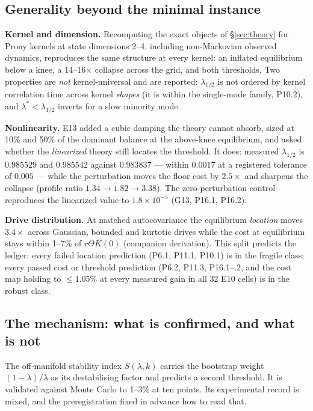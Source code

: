 \subsection{Generality beyond the minimal instance}

\textbf{Kernel and dimension.} Recomputing the exact objects of
\S\ref{sec:theory} for Prony kernels at state dimensions 2--4, including
non-Markovian observed dynamics, reproduces the same structure at every
kernel: an inflated equilibrium below a knee, a 14--16$\times$ collapse
across the grid, and both thresholds. Two properties are \emph{not}
kernel-universal and are reported: $\lambda_{1/2}$ is not ordered by kernel
correlation time across kernel \emph{shapes} (it is within the single-mode
family, P10.2), and $\lambda^\ast<\lambda_{1/2}$ inverts for a slow minority
mode.

\textbf{Nonlinearity.} E13 added a cubic damping the theory cannot absorb,
sized at 10\% and 50\% of the dominant balance at the above-knee equilibrium,
and asked whether the \emph{linearized} theory still locates the threshold.
It does: measured $\lambda_{1/2}$ is $0.985529$ and $0.985542$ against
$0.983837$ --- within $0.0017$ at a registered tolerance of $0.005$ --- while
the perturbation moves the floor cost by $2.5\times$ and sharpens the collapse
(profile ratio $1.34\to1.82\to3.38$). The zero-perturbation control
reproduces the linearized value to $1.8\times10^{-5}$ (G13, P16.1, P16.2).

\textbf{Drive distribution.} At matched autocovariance the equilibrium
\emph{location} moves $3.4\times$ across Gaussian, bounded and kurtotic
drives while the cost at equilibrium stays within 1--7\% of $r\Theta K(0)$
(companion derivation). This split predicts the ledger: every failed
location prediction (P6.1, P11.1, P10.1) is in the fragile class; every
passed cost or threshold prediction (P6.2, P11.3, P16.1--.2, and the cost
map holding to $\le1.05\%$ at every measured gain in all 32 E10 cells) is in
the robust class.

\subsection{The mechanism: what is confirmed, and what is
not}

The off-manifold stability index \(S(\lambda, k)\) carries the bootstrap
weight \((1-\lambda)/\lambda\) as its destabilising factor and predicts
a second threshold. It is validated against Monte Carlo to 1--3\% at ten
points. Its experimental record is mixed, and the preregistration fixed
in advance how to read that.

